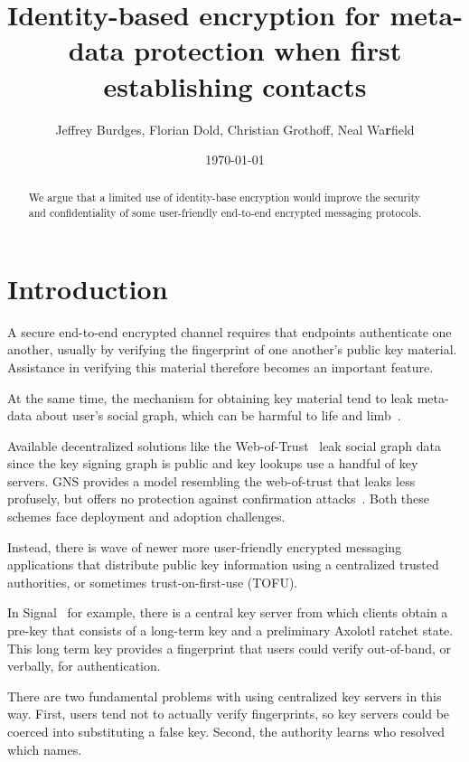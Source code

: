\documentclass[twoside,letterpaper]{sig-alternate}
\title{Identity-based encryption for meta-data protection when first establishing contacts}
\author{Jeffrey Burdges, Florian Dold, Christian Grothoff, Neal Wa{\bf r}field}
\date{\today}
\begin{document}
\maketitle


\begin{abstract}
We argue that a limited use of identity-base encryption would improve
the security and confidentiality of some user-friendly end-to-end
encrypted messaging protocols.
\end{abstract}


\section{Introduction}


A secure end-to-end encrypted channel requires that endpoints
authenticate one another, usually by verifying the fingerprint of
one another's public key material.
Assistance in verifying this material therefore becomes an important
feature. %

At the same time, the mechanism for obtaining key material tend to
leak meta-data about user's social graph, which can be harmful to
life and limb~\cite{skynet}.

Available decentralized solutions like the Web-of-Trust~\cite{wot}
leak social graph data since the key signing graph is public and
key lookups use a handful of key servers.  GNS provides a model
resembling the web-of-trust that leaks less profusely, but offers
no protection against confirmation attacks~\cite{gns}.
Both these schemes face deployment and adoption challenges.

Instead, there is wave of newer more user-friendly encrypted messaging
applications that distribute public key information using a centralized
trusted authorities, or sometimes trust-on-first-use (TOFU).

In Signal~\cite{TextSecure} for example, there is a central key server
from which clients obtain a pre-key that consists of a long-term key
and a preliminary Axolotl ratchet state.
This long term key provides a fingerprint that users could verify
out-of-band, or verbally, for authentication.

There are two fundamental problems with using centralized key servers
in this way.
First, users tend not to actually verify fingerprints, so
key servers could be coerced into substituting a false key.
Second, the authority learns who resolved which names.
\end{document}
